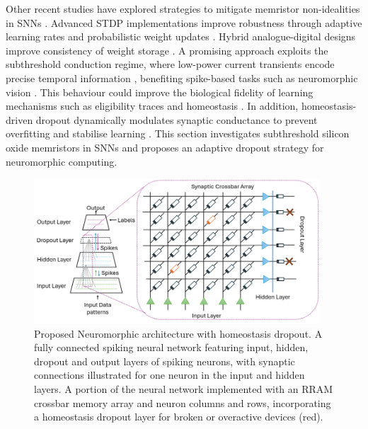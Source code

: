 \noindent Other recent studies have explored strategies to mitigate memristor non-idealities in SNNs \cite{morshed2023choose}. Advanced STDP implementations improve robustness through adaptive learning rates and probabilistic weight updates \cite{burr2017neuromorphic, pehle2022brainscales}. Hybrid analogue-digital designs improve consistency of weight storage \cite{friedmann2016demonstrating}. A promising approach exploits the subthreshold conduction regime, where low-power current transients encode precise temporal information \cite{mannion2023unipolar}, benefiting spike-based tasks such as neuromorphic vision \cite{mannion2020memristor}. This behaviour could improve the biological fidelity of learning mechanisms such as eligibility traces and homeostasis \cite{demiraug2021pcm, john2022reconfigurable}. In addition, homeostasis-driven dropout dynamically modulates synaptic conductance to prevent overfitting and stabilise learning \cite{vu2024spiking}. This section investigates subthreshold silicon oxide memristors in SNNs and proposes an adaptive dropout strategy for neuromorphic computing.\\

\begin{figure}[!t]
    \centerline{\includegraphics[width=0.95\textwidth]{Chapter7/Figs/a.png}}
    \caption[Proposed Neuromorphic architecture with homeostasis dropout]{Proposed Neuromorphic architecture with homeostasis dropout. A fully connected spiking neural network featuring input, hidden, dropout and output layers of spiking neurons, with synaptic connections illustrated for one neuron in the input and hidden layers. A portion of the neural network implemented with an RRAM crossbar memory array and neuron columns and rows, incorporating a homeostasis dropout layer for broken or overactive devices (red).}
    \label{fig:7a}
\end{figure}
    

